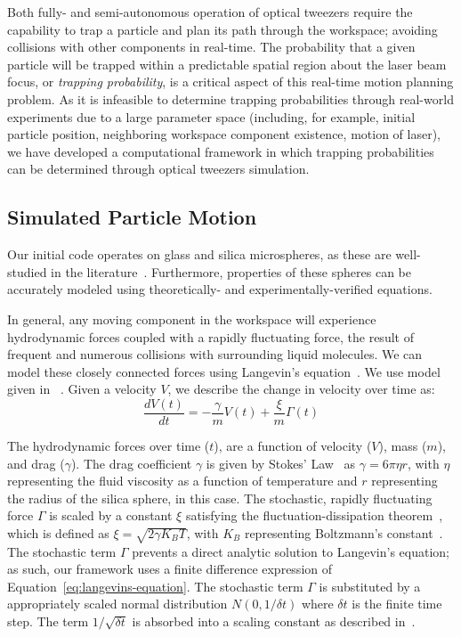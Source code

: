 
Both fully- and semi-autonomous operation of optical tweezers require
the capability to trap a particle and plan its path through the
workspace; avoiding collisions with other components in real-time.
The probability that a given particle will be trapped within a
predictable spatial region about the laser beam focus, or {\em
  trapping probability}, is a critical aspect of this real-time motion
planning problem.  As it is infeasible to determine trapping
probabilities through real-world experiments due to a large parameter
space (including, for example, initial particle position, neighboring
workspace component existence, motion of laser), we have developed a
computational framework in which trapping probabilities can be
determined through optical tweezers simulation.

\subsection{Simulated Particle Motion}
Our initial code operates on glass and silica microspheres, as these are
well-studied in the literature~\cite{wright1994parametric}.  Furthermore,
properties of these spheres can be accurately modeled using theoretically- and
experimentally-verified equations.

In general, any moving component in the workspace will experience hydrodynamic
forces coupled with a rapidly fluctuating force, the result of frequent and
numerous collisions with surrounding liquid molecules.  We can model these
closely connected forces using Langevin's equation~\cite{gardiner1985handbook,
langevin1908brownianmotion}. We use model given in ~\cite{balijepalli2010stochastic}.
Given a velocity $V$, we describe the change in
velocity over time as:
\begin{equation}
\label{eq:langevins-equation}
 \frac{dV(t)}{dt} = -\frac{\gamma}{m}V(t) + \frac{\xi}{m}\Gamma(t)
\end{equation}

The hydrodynamic forces over time ($t$), are a function of velocity
($V$), mass ($m$), and drag ($\gamma$).  The drag coefficient $\gamma$
is given by Stokes' Law~\cite{girault1979finite} as $\gamma = 6 \pi
\eta r$, with $\eta$ representing the fluid viscosity as a function of
temperature and $r$ representing the radius of the silica sphere, in
this case.  The stochastic, rapidly fluctuating force $\Gamma$ is
scaled by a constant $\xi$ satisfying the fluctuation-dissipation
theorem~\cite{weissbluth1989photon}, which is defined as $\xi =
\sqrt{2 \gamma K_B T}$, with $K_B$ representing Boltzmann's
constant~\cite{grassia2001dissipation}.  The stochastic term $\Gamma$
prevents a direct analytic solution to Langevin's equation; as such,
our framework uses a finite difference expression of
Equation~\ref{eq:langevins-equation}.  
The stochastic term $\Gamma$ is substituted by a appropriately scaled normal distribution
$N(0,1/\delta t)$ where $\delta t$ is the finite time step. The term  
$1/\sqrt{\delta t}$ is absorbed into a scaling constant as described in~\cite{balijepalli2010stochastic}.


